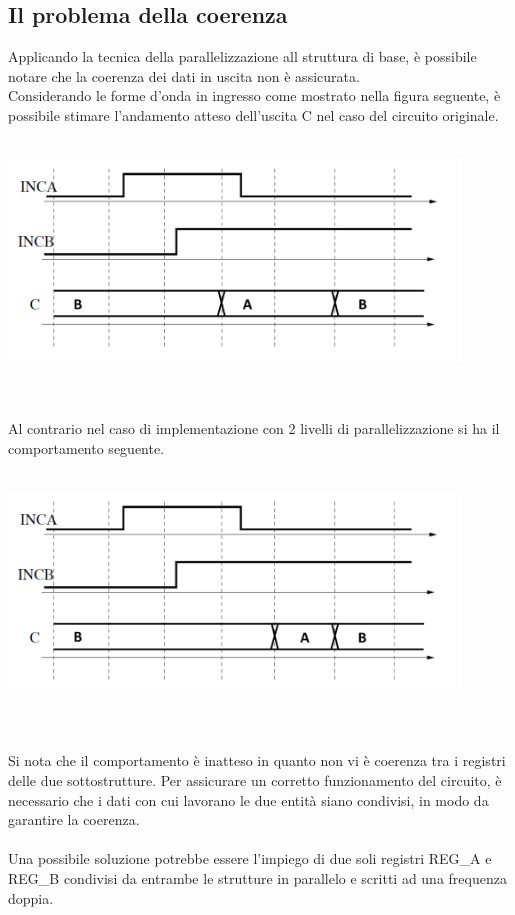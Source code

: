 \documentclass[11pt,  english, makeidx, a4paper, titlepage, oneside]{book}
\begin{document}
\subsection{Il problema della coerenza}
Applicando la tecnica della parallelizzazione all struttura di base, è possibile notare che la coerenza dei dati in uscita non è assicurata.
\\
Considerando le forme d'onda in ingresso come mostrato nella figura seguente, è possibile stimare l'andamento atteso dell'uscita C nel caso del circuito originale.
\\\\
\centerline{\includegraphics[width=12cm]{./img/Lab_3/Comportamento_atteso.png}}
\\\\
Al contrario nel caso di implementazione con 2 livelli di parallelizzazione si ha il comportamento seguente.
\\\\
\centerline{\includegraphics[width=12cm]{./img/Lab_3/Comportamento_attuale.png}}
\\\\
Si nota che il comportamento è inatteso in quanto non vi è coerenza tra i registri delle due sottostrutture. Per assicurare un corretto funzionamento del circuito, è necessario che i dati con cui lavorano le due entità siano condivisi, in modo da garantire la coerenza.
\\\\
Una possibile soluzione potrebbe essere l'impiego di due soli registri REG\_A e REG\_B condivisi da entrambe le strutture in parallelo e scritti ad una frequenza doppia.
\end{document}
